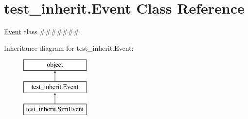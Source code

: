 \hypertarget{classtest__inherit_1_1_event}{\section{test\-\_\-inherit.\-Event Class Reference}
\label{classtest__inherit_1_1_event}
}


\hyperlink{classtest__inherit_1_1_event}{Event} class \#\#\#\#\#\#\#.  


Inheritance diagram for test\-\_\-inherit.\-Event\-:\begin{figure}[H]
\begin{center}
\leavevmode
\includegraphics[height=3.000000cm]{da/db5/classtest__inherit_1_1_event}
\end{center}
\end{figure}
